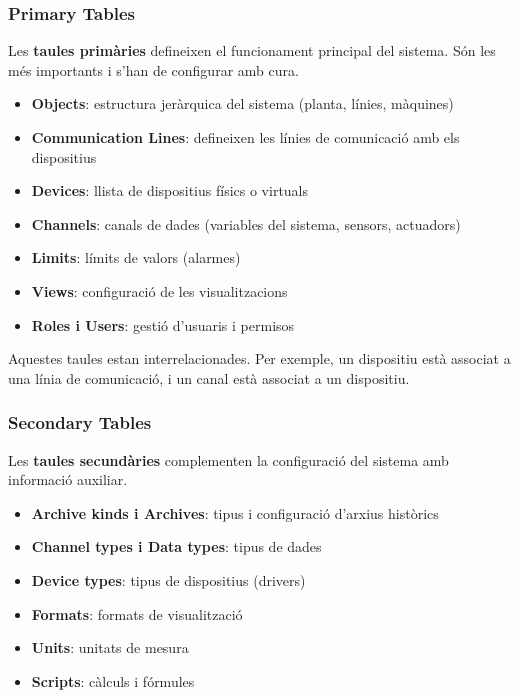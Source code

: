\documentclass[12pt,a4paper]{report}
\begin{document}
\subsubsection{Primary Tables}

Les \textbf{taules primàries} defineixen el funcionament principal del sistema. Són les més importants i s'han de configurar amb cura.

\begin{itemize}
    \item \textbf{Objects}: estructura jeràrquica del sistema (planta, línies, màquines)
    \item \textbf{Communication Lines}: defineixen les línies de comunicació amb els dispositius
    \item \textbf{Devices}: llista de dispositius físics o virtuals
    \item \textbf{Channels}: canals de dades (variables del sistema, sensors, actuadors)
    \item \textbf{Limits}: límits de valors (alarmes)
    \item \textbf{Views}: configuració de les visualitzacions
    \item \textbf{Roles i Users}: gestió d'usuaris i permisos
\end{itemize}

Aquestes taules estan interrelacionades. Per exemple, un dispositiu està associat a una línia de comunicació, i un canal està associat a un dispositiu.

\subsubsection{Secondary Tables}

Les \textbf{taules secundàries} complementen la configuració del sistema amb informació auxiliar.

\begin{itemize}
    \item \textbf{Archive kinds i Archives}: tipus i configuració d'arxius històrics
    \item \textbf{Channel types i Data types}: tipus de dades
    \item \textbf{Device types}: tipus de dispositius (drivers)
    \item \textbf{Formats}: formats de visualització
    \item \textbf{Units}: unitats de mesura
    \item \textbf{Scripts}: càlculs i fórmules
\end{itemize}
\end{document}
